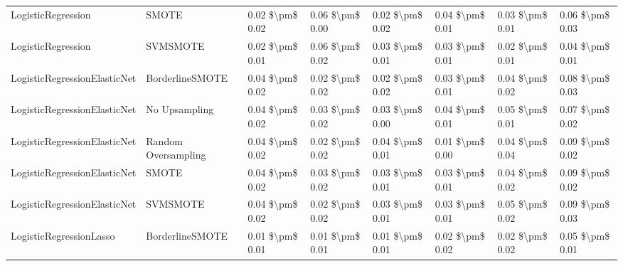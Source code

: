 \begin{tabular}{llllllll}
             LogisticRegression &                         SMOTE & 0.02 \$\textbackslash pm\$ 0.02 &           0.06 \$\textbackslash pm\$ 0.00 &       0.02 \$\textbackslash pm\$ 0.02 &        0.04 \$\textbackslash pm\$ 0.01 &                         0.03 \$\textbackslash pm\$ 0.01 & 0.06 \$\textbackslash pm\$ 0.03 \\
             LogisticRegression &                      SVMSMOTE & 0.02 \$\textbackslash pm\$ 0.01 &           0.06 \$\textbackslash pm\$ 0.02 &       0.03 \$\textbackslash pm\$ 0.01 &        0.03 \$\textbackslash pm\$ 0.01 &                         0.02 \$\textbackslash pm\$ 0.01 & 0.04 \$\textbackslash pm\$ 0.01 \\
   LogisticRegressionElasticNet &               BorderlineSMOTE & 0.04 \$\textbackslash pm\$ 0.02 &           0.02 \$\textbackslash pm\$ 0.02 &       0.02 \$\textbackslash pm\$ 0.02 &        0.03 \$\textbackslash pm\$ 0.01 &                         0.04 \$\textbackslash pm\$ 0.02 & 0.08 \$\textbackslash pm\$ 0.03 \\
   LogisticRegressionElasticNet &                 No Upsampling & 0.04 \$\textbackslash pm\$ 0.02 &           0.03 \$\textbackslash pm\$ 0.02 &       0.03 \$\textbackslash pm\$ 0.00 &        0.04 \$\textbackslash pm\$ 0.01 &                         0.05 \$\textbackslash pm\$ 0.01 & 0.07 \$\textbackslash pm\$ 0.02 \\
   LogisticRegressionElasticNet &           Random Oversampling & 0.04 \$\textbackslash pm\$ 0.02 &           0.02 \$\textbackslash pm\$ 0.02 &       0.04 \$\textbackslash pm\$ 0.01 &        0.01 \$\textbackslash pm\$ 0.00 &                         0.04 \$\textbackslash pm\$ 0.04 & 0.09 \$\textbackslash pm\$ 0.02 \\
   LogisticRegressionElasticNet &                         SMOTE & 0.04 \$\textbackslash pm\$ 0.02 &           0.03 \$\textbackslash pm\$ 0.02 &       0.03 \$\textbackslash pm\$ 0.01 &        0.03 \$\textbackslash pm\$ 0.01 &                         0.04 \$\textbackslash pm\$ 0.02 & 0.09 \$\textbackslash pm\$ 0.02 \\
   LogisticRegressionElasticNet &                      SVMSMOTE & 0.04 \$\textbackslash pm\$ 0.02 &           0.02 \$\textbackslash pm\$ 0.02 &       0.03 \$\textbackslash pm\$ 0.01 &        0.03 \$\textbackslash pm\$ 0.01 &                         0.05 \$\textbackslash pm\$ 0.02 & 0.09 \$\textbackslash pm\$ 0.03 \\
        LogisticRegressionLasso &               BorderlineSMOTE & 0.01 \$\textbackslash pm\$ 0.01 &           0.01 \$\textbackslash pm\$ 0.01 &       0.01 \$\textbackslash pm\$ 0.01 &        0.02 \$\textbackslash pm\$ 0.02 &                         0.02 \$\textbackslash pm\$ 0.02 & 0.05 \$\textbackslash pm\$ 0.01 \\

\end{tabular}
